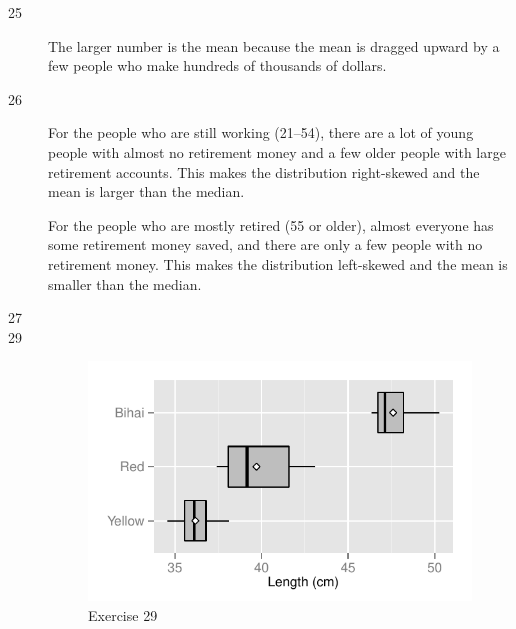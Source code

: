 \documentclass[letterpaper, landscape]{exam}
\begin{document}
    \begin{description}
      \item[25] The larger number is the mean because the mean is dragged upward by a few
        people who make hundreds of thousands of dollars.

      \item[26] 
        For the people who are still working (21--54), there are a lot of young people with
        almost no retirement money and a few older people with large retirement accounts.
        This makes the distribution right-skewed and the mean is larger than the median.

        For the people who are mostly retired (55 or older), almost everyone has some
        retirement money saved, and there are only a few people with no retirement money.
        This makes the distribution left-skewed and the mean is smaller than the median.

      \item[27] 

      \item[29]
        \begin{figure}[H]
          \centering
          \includegraphics{figures/ex29.pdf}
          \caption{Exercise 29}
        \end{figure}


\end{description}
\end{document}
